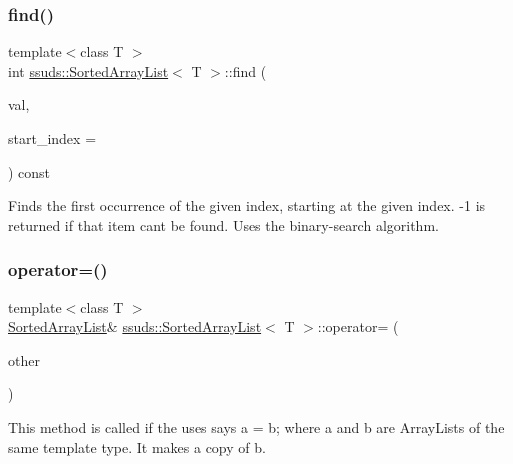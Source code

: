 \subsubsection{\texorpdfstring{find()}{find()}}
{\footnotesize\ttfamily template$<$class T $>$ \\
int \mbox{\hyperlink{classssuds_1_1_sorted_array_list}{ssuds\+::\+Sorted\+Array\+List}}$<$ T $>$\+::find (\begin{DoxyParamCaption}\item[{const T \&}]{val,  }\item[{int}]{start\+\_\+index = {} }\end{DoxyParamCaption}) const\hspace{0.3cm}{\ttfamily [inline]}}

Finds the first occurrence of the given index, starting at the given index. -\/1 is returned if that item can\textquotesingle{}t be found. Uses the binary-\/search algorithm. \mbox{\label{classssuds_1_1_sorted_array_list_abdc8e1844f87e66c76cd0c925f8a7ebd}} 
\subsubsection{\texorpdfstring{operator=()}{operator=()}}
{\footnotesize\ttfamily template$<$class T $>$ \\
\mbox{\hyperlink{classssuds_1_1_sorted_array_list}{Sorted\+Array\+List}}\& \mbox{\hyperlink{classssuds_1_1_sorted_array_list}{ssuds\+::\+Sorted\+Array\+List}}$<$ T $>$\+::operator= (\begin{DoxyParamCaption}\item[{const \mbox{\hyperlink{classssuds_1_1_sorted_array_list}{Sorted\+Array\+List}}$<$ T $>$ \&}]{other }\end{DoxyParamCaption})\hspace{0.3cm}{\ttfamily [inline]}}

This method is called if the uses says a = b; where a and b are Array\+Lists of the same template type. It makes a copy of b. \mbox{\label{classssuds_1_1_sorted_array_list_a6e79261f08edc46db53858fb66443b3c}} 
